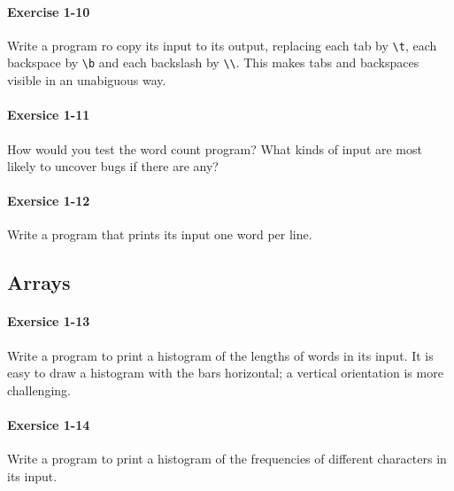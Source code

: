 		\paragraph{Exercise 1-10}
			Write a program ro copy its input to its output, replacing each tab by
			\lstinline{\t}, each backspace by \lstinline{\b} and each backslash by
			\lstinline{\\}. This makes tabs and backspaces visible in an unabiguous
			way.

			\hfill{}\cite[p.~20]{knr}
			

		\paragraph{Exersice 1-11}
			How would you test the word count program? What kinds of input are
			most likely to uncover bugs if there are any?

			\hfill{}\cite[p.~21]{knr}

		\paragraph{Exersice 1-12}
			Write a program that prints its input one word per line.
			
			\hfill{}\cite[p.~21]{knr}

			

	\newpage
	\subsection{Arrays}
		\paragraph{Exersice 1-13}
			Write a program to print a histogram of the lengths of words in
			its input. It is easy to draw a histogram with the bars horizontal;
			a vertical orientation is more challenging.
	
			\hfill{}\cite[p.~24]{knr}

			

		\paragraph{Exersice 1-14}
			Write a program to print a histogram of the frequencies of different
			characters in its input.
	

